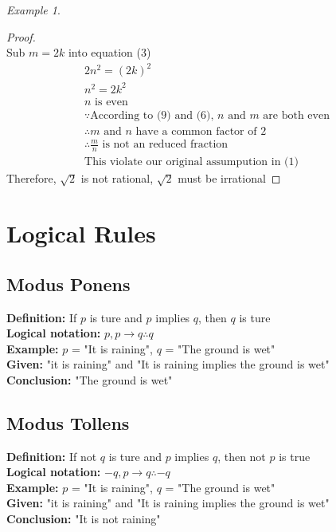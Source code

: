 \documentclass[11pt]{report}
\theoremstyle{remark}
\newtheorem*{example}{Example}
\begin{document}
\begin{example}
\begin{proof}
		\\
		Sub $m = 2k$ into equation (3)
		\begin{gather}
			2n^2 = (2k)^2 \\
			n^2 = 2k^2 \\
			\text{$n$ is even}\\
			\because \text{According to (9) and (6), $n$ and $m$ are both even} \\
			\therefore \text{$m$ and $n$ have a common factor of 2} \\
			\therefore \text{$\frac{m}{n}$ is not an reduced fraction}\\
			\text{This violate our original assumpution in (1)}
		\end{gather}
		Therefore, $\sqrt{2}$ is not rational, $\sqrt{2}$ must be irrational
	\end{proof}
	\end{example}

	\section{Logical Rules}
	\subsection{Modus Ponens}
	\begin{center}

		\textbf{Definition: }If $p$ is ture and $p$ implies $q$, then $q$ is ture \\
		\textbf{Logical notation: } $p, p\to q\therefore q$ \\
		\textbf{Example: }$p$ = "It is raining", $q$ = "The ground is wet"\\
		\textbf{Given: }"it is raining" and "It is raining implies the ground is wet"\\
		\textbf{Conclusion: }"The ground is wet"\\
		
	\end{center}

	\subsection{Modus Tollens}
	\begin{center}
		\textbf{Definition: }If not $q$ is ture and $p$ implies $q$, then not $p$ is true \\
		\textbf{Logical notation: } $-q, p \to q \therefore -q$ \\
		\textbf{Example: } $p$ = "It is raining", $q$ = "The ground is wet"\\
		\textbf{Given: } "it is raining" and "It is raining implies the ground is wet"\\
		\textbf{Conclusion: } "It is not raining"\\
	\end{center}
\end{document}
